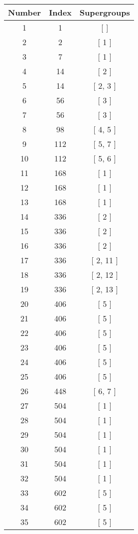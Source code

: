 \begin{center}
\begin{longtable}[H]{|| c c c ||}
\hline
Number & Index & Supergroups \\ 
\hline
1 & 1 & [ ] \\ 
\hline
2 & 2 & [ 1 ] \\ 
\hline
3 & 7 & [ 1 ] \\ 
\hline
4 & 14 & [ 2 ] \\ 
\hline
5 & 14 & [ 2, 3 ] \\ 
\hline
6 & 56 & [ 3 ] \\ 
\hline
7 & 56 & [ 3 ] \\ 
\hline
8 & 98 & [ 4, 5 ] \\ 
\hline
9 & 112 & [ 5, 7 ] \\ 
\hline
10 & 112 & [ 5, 6 ] \\ 
\hline
11 & 168 & [ 1 ] \\ 
\hline
12 & 168 & [ 1 ] \\ 
\hline
13 & 168 & [ 1 ] \\ 
\hline
14 & 336 & [ 2 ] \\ 
\hline
15 & 336 & [ 2 ] \\ 
\hline
16 & 336 & [ 2 ] \\ 
\hline
17 & 336 & [ 2, 11 ] \\ 
\hline
18 & 336 & [ 2, 12 ] \\ 
\hline
19 & 336 & [ 2, 13 ] \\ 
\hline
20 & 406 & [ 5 ] \\ 
\hline
21 & 406 & [ 5 ] \\ 
\hline
22 & 406 & [ 5 ] \\ 
\hline
23 & 406 & [ 5 ] \\ 
\hline
24 & 406 & [ 5 ] \\ 
\hline
25 & 406 & [ 5 ] \\ 
\hline
26 & 448 & [ 6, 7 ] \\ 
\hline
27 & 504 & [ 1 ] \\ 
\hline
28 & 504 & [ 1 ] \\ 
\hline
29 & 504 & [ 1 ] \\ 
\hline
30 & 504 & [ 1 ] \\ 
\hline
31 & 504 & [ 1 ] \\ 
\hline
32 & 504 & [ 1 ] \\ 
\hline
33 & 602 & [ 5 ] \\ 
\hline
34 & 602 & [ 5 ] \\ 
\hline
35 & 602 & [ 5 ] \\ 
\hline

\end{longtable}
\end{center}
